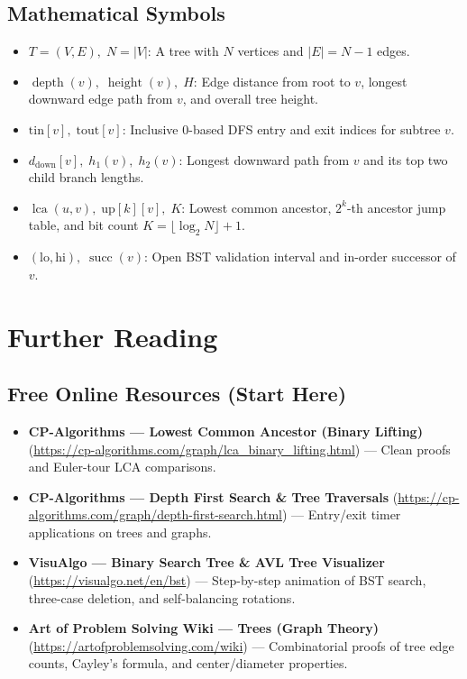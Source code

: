 \documentclass[11pt,a4paper]{article}
\theoremstyle{definition}
\begin{document}
\subsection*{Mathematical Symbols}
\begin{itemize}[itemsep=2pt]
    \item $T = (V, E),\; N = |V|$: A tree with $N$ vertices and $|E| = N - 1$ edges.
    \item $\operatorname{depth}(v),\; \operatorname{height}(v),\; H$: Edge distance from root to $v$, longest downward edge path from $v$, and overall tree height.
    \item $\text{tin}[v],\; \text{tout}[v]$: Inclusive $0$-based DFS entry and exit indices for subtree $v$.
    \item $d_{\text{down}}[v],\; h_1(v),\; h_2(v)$: Longest downward path from $v$ and its top two child branch lengths.
    \item $\operatorname{lca}(u, v),\; \text{up}[k][v],\; K$: Lowest common ancestor, $2^k$-th ancestor jump table, and bit count $K = \lfloor \log_2 N \rfloor + 1$.
    \item $(\text{lo}, \text{hi}),\; \operatorname{succ}(v)$: Open BST validation interval and in-order successor of $v$.
\end{itemize}

\section{Further Reading}
\label{sec:reading}

\subsection*{Free Online Resources (Start Here)}
\begin{itemize}
    \item \textbf{CP-Algorithms --- Lowest Common Ancestor (Binary Lifting)} (\url{https://cp-algorithms.com/graph/lca_binary_lifting.html}) --- Clean proofs and Euler-tour LCA comparisons.
    \item \textbf{CP-Algorithms --- Depth First Search \& Tree Traversals} (\url{https://cp-algorithms.com/graph/depth-first-search.html}) --- Entry/exit timer applications on trees and graphs.
    \item \textbf{VisuAlgo --- Binary Search Tree \& AVL Tree Visualizer} (\url{https://visualgo.net/en/bst}) --- Step-by-step animation of BST search, three-case deletion, and self-balancing rotations.
    \item \textbf{Art of Problem Solving Wiki --- Trees (Graph Theory)} (\url{https://artofproblemsolving.com/wiki}) --- Combinatorial proofs of tree edge counts, Cayley's formula, and center/diameter properties.
\end{itemize}
\end{document}

